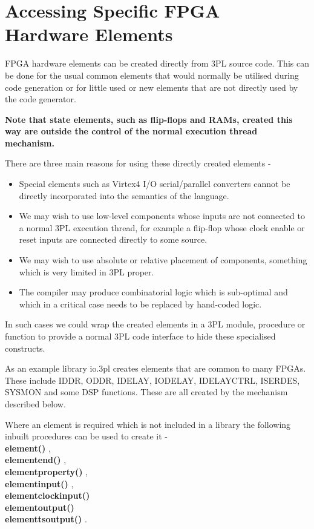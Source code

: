 \pagebreak

\chapter{Accessing Specific FPGA Hardware Elements}\label{chap:asfpgahe}
    
    FPGA hardware elements can be created directly from 3PL source code.
    This can be done for the usual common elements that would normally be
    utilised during code generation or for little used or new elements that
    are not directly used by the code generator.
    
    {\bf Note that state elements, such as flip-flops and RAMs, created this way are
    outside the control of the normal execution thread mechanism.}
    
    There are
    three main reasons for using these directly created elements -
    \begin{itemize}
    \item   Special elements such as Virtex4 I/O serial/parallel converters
            cannot be directly incorporated into the semantics of the language.
    \item   We may wish to use low-level components whose inputs are
            not connected to a normal 3PL execution thread, for example a
            flip-flop whose clock enable or reset inputs are connected directly
            to some source.
    \item   We may wish to use absolute or relative placement of components,
            something which is very limited in 3PL proper.
    \item   The compiler may produce combinatorial logic which is sub-optimal
            and which in a critical case needs to be replaced by hand-coded
            logic.
    \end{itemize}
    In such cases we could wrap the created elements in a 3PL module,
    procedure or function to provide a normal 3PL code interface to hide
    these specialised constructs.
    
    As an example library io.3pl creates elements that are common to
    many FPGAs. These include IDDR, ODDR, IDELAY, IODELAY, IDELAYCTRL,
    ISERDES, SYSMON and some DSP functions. These are all created by the
    mechanism described below.
    
    Where an element is required which is not included in a library the
    following inbuilt procedures can be used to create it - \\
    {\bf element()} , \\
    {\bf elementend()} , \\
    {\bf elementproperty()} , \\
    {\bf elementinput()} , \\
    {\bf elementclockinput()}  \\
    {\bf elementoutput()}  \\
    {\bf elementtsoutput()} .
    
